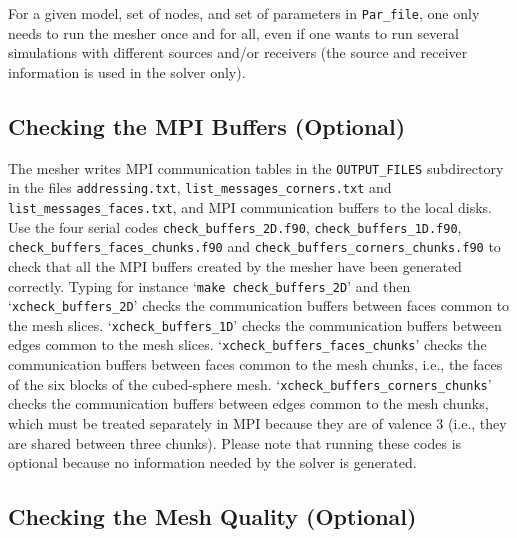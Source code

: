 \documentclass[onecolumn]{article}
\begin{document}
For a given model, set of nodes, and set of parameters in \texttt{Par\_file},
one only needs to run the mesher once and for all, even if one wants
to run several simulations with different sources and/or receivers
(the source and receiver information is used in the solver only).

\subsection{Checking the MPI Buffers (Optional)}

The mesher writes MPI communication tables in the \texttt{OUTPUT\_FILES}
subdirectory in the files \texttt{addressing.txt},
\texttt{list\_messages\_corners.txt} and \texttt{list\_messages\_faces.txt},
and MPI communication buffers to the local disks.
Use the four serial codes \texttt{check\_buffers\_2D.f90},
\texttt{check\_buffers\_1D.f90}, \texttt{check\_buffers\_faces\_chunks.f90}
and \texttt{check\_buffers\_corners\_chunks.f90} to check that all the MPI buffers
created by the mesher have been generated correctly.
Typing for instance `\texttt{make check\_buffers\_2D}' and then
`\texttt{xcheck\_buffers\_2D}' checks the communication buffers between faces common to the mesh slices.
`\texttt{xcheck\_buffers\_1D}' checks the communication buffers between edges common to the mesh slices.
`\texttt{xcheck\_buffers\_faces\_chunks}' checks the communication buffers between faces common to the mesh chunks, i.e., the faces of the six blocks of the cubed-sphere mesh.
`\texttt{xcheck\_buffers\_corners\_chunks}' checks the communication buffers between edges common to the mesh chunks, which must be treated separately in MPI because they are of valence 3 (i.e., they are shared between three chunks).
Please note that running these codes is optional because no information needed by the solver is generated.

\subsection{Checking the Mesh Quality (Optional)}
\label{section:quality}
\end{document}
